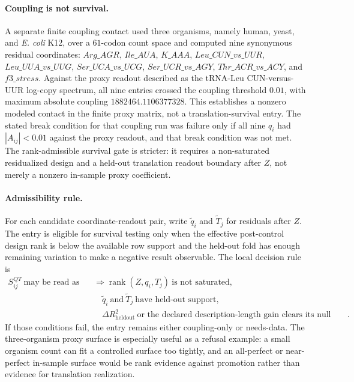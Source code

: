 \paragraph{Coupling is not survival.}
A separate finite coupling contact used three organisms, namely human, yeast, and \emph{E. coli} K12, over a $61$-codon count space and computed nine synonymous residual coordinates: $Arg\_AGR$, $Ile\_AUA$, $K\_AAA$, $Leu\_CUN\_vs\_UUR$, $Leu\_UUA\_vs\_UUG$, $Ser\_UCA\_vs\_UCG$, $Ser\_UCR\_vs\_AGY$, $Thr\_ACR\_vs\_ACY$, and $f3\_stress$.  Against the proxy readout described as the tRNA-Leu CUN-versus-UUR log-copy spectrum, all nine entries crossed the coupling threshold $0.01$, with maximum absolute coupling $1882464.1106377328$.  This establishes a nonzero modeled contact in the finite proxy matrix, not a translation-survival entry.  The stated break condition for that coupling run was failure only if all nine $q_i$ had $|A_{ij}|<0.01$ against the proxy readout, and that break condition was not met.  The rank-admissible survival gate is stricter: it requires a non-saturated residualized design and a held-out translation readout boundary after $Z$, not merely a nonzero in-sample proxy coefficient.

\paragraph{Admissibility rule.}
For each candidate coordinate-readout pair, write $\widetilde q_i$ and $\widetilde T_j$ for residuals after $Z$.  The entry is eligible for survival testing only when the effective post-control design rank is below the available row support and the held-out fold has enough remaining variation to make a negative result observable.  The local decision rule is
$$
\begin{aligned}
S^{QT}_{ij}\ \text{may be read as survival} 
&\Longrightarrow \operatorname{rank}(Z, q_i, T_j)\ \text{is not saturated},\\
&\quad \widetilde q_i\ \text{and}\ \widetilde T_j\ \text{have held-out support},\\
&\quad \Delta R^2_{\mathrm{heldout}}\ \text{or the declared description-length gain clears its null boundary}.
\end{aligned}
$$
If those conditions fail, the entry remains either coupling-only or needs-data.  The three-organism proxy surface is especially useful as a refusal example: a small organism count can fit a controlled surface too tightly, and an all-perfect or near-perfect in-sample surface would be rank evidence against promotion rather than evidence for translation realization.

